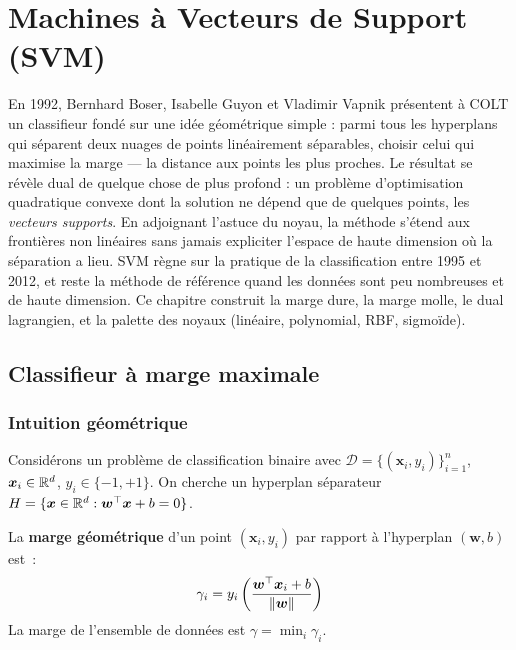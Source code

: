 \chapter{Machines \`a Vecteurs de Support (SVM)}
\label{ch:svm}

En 1992, Bernhard Boser, Isabelle Guyon et Vladimir Vapnik présentent à COLT un classifieur fondé sur une idée géométrique simple : parmi tous les hyperplans qui séparent deux nuages de points linéairement séparables, choisir celui qui maximise la marge --- la distance aux points les plus proches. Le résultat se révèle dual de quelque chose de plus profond : un problème d'optimisation quadratique convexe dont la solution ne dépend que de quelques points, les \emph{vecteurs supports}. En adjoignant l'astuce du noyau, la méthode s'étend aux frontières non linéaires sans jamais expliciter l'espace de haute dimension où la séparation a lieu. SVM règne sur la pratique de la classification entre 1995 et 2012, et reste la méthode de référence quand les données sont peu nombreuses et de haute dimension. Ce chapitre construit la marge dure, la marge molle, le dual lagrangien, et la palette des noyaux (linéaire, polynomial, RBF, sigmoïde).

\section{Classifieur \`a marge maximale}
\label{sec:svm-marge}

\subsection{Intuition g\'eom\'etrique}

Consid\'erons un probl\`eme de classification binaire avec
$\mathcal{D} = \{(\bm{x}_i, y_i)\}_{i=1}^n$, $\bm{x}_i \in \mathbb{R}^d$,
$y_i \in \{-1, +1\}$. On cherche un hyperplan s\'eparateur
$H = \{\bm{x} \in \mathbb{R}^d : \bm{w}^\top \bm{x} + b = 0\}$.

\begin{definition}
La \textbf{marge g\'eom\'etrique} d'un point $(\bm{x}_i, y_i)$ par rapport \`a
l'hyperplan $(\bm{w}, b)$ est~:
\begin{equation}
  \gamma_i = y_i \left( \frac{\bm{w}^\top \bm{x}_i + b}{\left\| \bm{w} \right\|} \right)
\end{equation}
La marge de l'ensemble de donn\'ees est $\gamma = \min_{i} \gamma_i$.
\end{definition}

